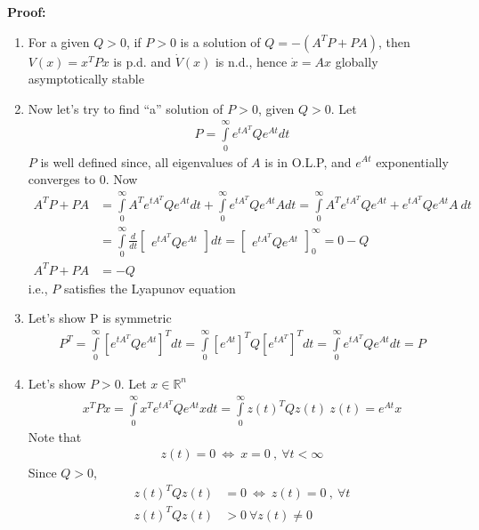 \documentclass[twoside]{article}
\begin{document}
\textbf{Proof:} 
\begin{enumerate}
\item For a given $Q > 0$, if $P > 0$ is a solution of $Q = - (A^T P + P A)$, then $V(x) = x^T P x$ is p.d. and $\dot{V}(x)$ is n.d., hence
$\dot{x} = A x$ globally asymptotically stable
%
\item Now let's try to find ``a'' solution of $P > 0$, given $Q>0$. Let
%
\begin{align*}
P = \int\limits_{0}^{\infty} e^{t A^T} Q e^{A t} dt
\end{align*}
%
$P$ is well defined since, all eigenvalues of $A$ is in O.L.P, and 
$e^{A t}$ exponentially converges to $0$. Now
%
\begin{align*}
A^T P + P A &= \int\limits_{0}^{\infty} A^T e^{t A^T} Q e^{A t} dt
+ \int\limits_{0}^{\infty} e^{t A^T} Q e^{A t} A dt 
= \int\limits_{0}^{\infty} A^T e^{t A^T} Q e^{A t} + e^{t A^T} Q e^{A t} A \ dt
\\
&= \int\limits_{0}^{\infty} \frac{d}{dt} \begin{bmatrix}
    e^{t A^T} Q e^{A t}
\end{bmatrix} dt =  \begin{bmatrix}
    e^{t A^T} Q e^{A t} 
\end{bmatrix}_{0}^{\infty} = 0 -Q 
\\
A^T P + P A &= -Q
\end{align*}
%
i.e., $P$ satisfies the Lyapunov equation
%
\item Let's show P is symmetric
%
\begin{align*}
P^T = \int\limits_{0}^{\infty} \left[ e^{t A^T} Q e^{A t} \right]^T dt
= \int\limits_{0}^{\infty} \left[ e^{A t} \right]^T Q 
\left[ e^{t A^T}\right]^T dt
= \int\limits_{0}^{\infty} e^{t A^T} Q e^{A t} dt = P
\end{align*}
%
\item Let's show $P > 0$. Let $x \in \mathbb{R}^n$
%
\begin{align*}
x^T P x = \int\limits_{0}^{\infty} x^T e^{t A^T} Q e^{A t} x dt =
\int\limits_{0}^{\infty} z(t)^T Q z(t) \ z(t) = e^{A t} x
\end{align*}
%
Note that 
%
\begin{align*}
z(t) = 0 \ \iff \ x = 0 \ , \  \forall t < \infty
\end{align*}
%
Since $Q > 0$, 
%
\begin{align*}
z(t)^T Q z(t) &= 0 \ \iff \ z(t) = 0 \ , \  \forall t 
\\
z(t)^T Q z(t) &> 0 \ \forall z(t) \neq 0
\end{align*}

\end{enumerate}
\end{document}
